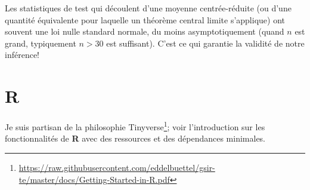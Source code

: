 \documentclass[
  11pt,
  letterpaper,
]{article}
\renewcommand{\href}[2]{#2\footnote{\url{#1}}}
\theoremstyle{definition}
\theoremstyle{definition}
\theoremstyle{definition}
\theoremstyle{remark}
\begin{document}
Les statistiques de test qui découlent d'une moyenne centrée-réduite (ou d'une quantité équivalente pour laquelle un théorème central limite s'applique) ont souvent une loi nulle standard normale, du moins asymptotiquement (quand \(n\) est grand, typiquement \(n>30\) est suffisant). C'est ce qui garantie la validité de notre inférence!

\hypertarget{r}{%
\section*{\texorpdfstring{\textbf{R}}{R}}\label{r}}

Je suis partisan de la \href{https://raw.githubusercontent.com/eddelbuettel/gsir-te/master/docs/Getting-Started-in-R.pdf}{philosophie Tinyverse}; voir l'introduction sur les fonctionnalités de \textbf{R} avec des ressources et des dépendances minimales.

  
\end{document}
